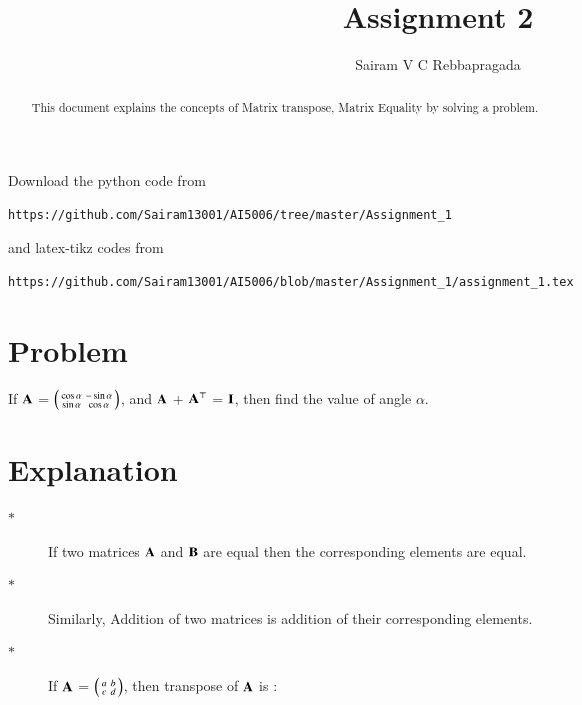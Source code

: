 \documentclass[journal,12pt,twocolumn]{IEEEtran}
\begin{document}
\renewcommand{\thefigure}{\theproblem}
\def\putbox#1#2#3{\makebox[0in][l]{\makebox[#1][l]{}\raisebox{\baselineskip}[0in][0in]{\raisebox{#2}[0in][0in]{#3}}}}
     \def\rightbox#1{\makebox[0in][r]{#1}}
     \def\centbox#1{\makebox[0in]{#1}}
     \def\topbox#1{\raisebox{-\baselineskip}[0in][0in]{#1}}
     \def\midbox#1{\raisebox{-0.5\baselineskip}[0in][0in]{#1}}
\vspace{3cm}
\title{Assignment 2}
\author{Sairam V C Rebbapragada}
\maketitle
\newpage
\bigskip
\renewcommand{\thefigure}{\theenumi}
\renewcommand{\thetable}{\theenumi}
\begin{abstract}
This document explains the concepts of Matrix transpose, Matrix Equality by solving a problem.
\end{abstract}
Download the python code from 
%
\begin{lstlisting}
https://github.com/Sairam13001/AI5006/tree/master/Assignment_1
\end{lstlisting}
%
and latex-tikz codes from 
%
\begin{lstlisting}
https://github.com/Sairam13001/AI5006/blob/master/Assignment_1/assignment_1.tex
\end{lstlisting}
%
\section{Problem}
If $\mathbf{A}$  = $\begin{psmallmatrix} \cos{\alpha} & -\sin{\alpha}\\ \sin{\alpha} & \cos{\alpha} \end{psmallmatrix}$, and $\mathbf{A}$ + $\mathbf{A}^\top$ = $\mathbf{I}$, then find the value of angle $\alpha$.
\section{Explanation}
\begin{description}

  \item[$\ast$ ] If two matrices $\mathbf{A}$ and $\mathbf{B}$ are equal then the corresponding elements are equal.
  \item[$\ast$ ]   Similarly, Addition of two matrices is addition of their corresponding elements.
  \item[$\ast$ ]  If $\mathbf{A}$  = $\begin{psmallmatrix} a & b\\ c & d \end{psmallmatrix}$, then transpose of $\mathbf{A}$ is : 
  
\end{description}
  
\end{document}
